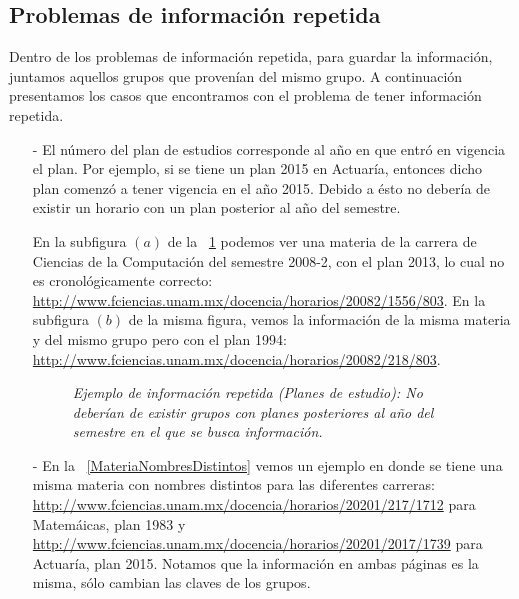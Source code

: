\subsection{Problemas de información repetida}

Dentro de los problemas de información repetida, para guardar la información, juntamos aquellos grupos que provenían del mismo grupo. A continuación presentamos los casos que encontramos con el problema de tener información repetida.

\begin{itemize}
\item[-] El número del plan de estudios corresponde al año en que entró en vigencia el plan. Por ejemplo, si se tiene un plan 2015 en Actuaría, entonces dicho plan comenzó a tener vigencia en el año 2015. Debido a ésto no debería de existir un horario con un plan posterior al año del semestre.

En la subfigura $(a)$ de la \figurename{~\ref{planRepetido}} podemos ver una materia de la carrera de Ciencias de la Computación del semestre 2008-2, con el plan 2013, lo cual no es cronológicamente correcto: \url{http://www.fciencias.unam.mx/docencia/horarios/20082/1556/803}. En la subfigura $(b)$ de la misma figura, vemos la información de la misma materia y del mismo grupo pero con el plan 1994: \url{http://www.fciencias.unam.mx/docencia/horarios/20082/218/803}.

\begin{figure}[H]
\centering
{} %
	\caption[\textit{Ejemplo de información repetida: Planes de estudio}]{\textit{Ejemplo de información repetida (Planes de estudio): No deberían de existir grupos con planes posteriores al año del semestre en el que se busca información.}}\label{planRepetido}
\end{figure}

\item[-] En la \figurename{~\ref{MateriaNombresDistintos}} vemos un ejemplo en donde se tiene una misma materia con nombres distintos para las diferentes carreras: \url{http://www.fciencias.unam.mx/docencia/horarios/20201/217/1712} para Matemáicas, plan 1983 y \url{http://www.fciencias.unam.mx/docencia/horarios/20201/2017/1739} para Actuaría, plan 2015. Notamos que la información en ambas páginas es la misma, sólo cambian las claves de los grupos.


\end{itemize}
